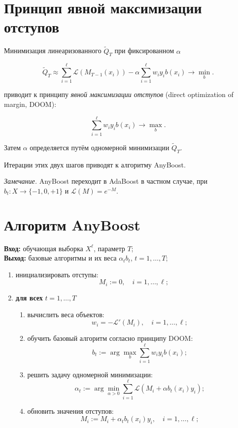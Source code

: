 \section*{Принцип явной максимизации отступов}

Минимизация линеаризованного $\tilde{Q}_T$ при фиксированном $\alpha$

\[
    \tilde{Q}_T \approx \sum_{i=1}^{\ell} \mathcal{L}(M_{T-1}(x_i)) - \alpha \sum_{i=1}^{\ell} w_i y_i b(x_i) \to \min_{b}.
\]

приводит к принципу \textit{явной максимизации отступов} (direct optimization of margin, DOOM):

\[
    \sum_{i=1}^{\ell} w_i y_i b(x_i) \to \max_{b}.
\]

Затем $\alpha$ определяется путём одномерной минимизации $\tilde{Q}_T$.

Итерации этих двух шагов приводят к алгоритму AnyBoost.

\textit{Замечание.} AnyBoost переходит в AdaBoost в частном случае, при $b_t : X \to \{-1, 0, +1\}$ и $\mathcal{L}(M) = e^{-M}$.


\section*{Алгоритм AnyBoost}

\textbf{Вход:} обучающая выборка $X^\ell$, параметр $T$;\\
\textbf{Выход:} базовые алгоритмы и их веса $\alpha_t b_t$, $t = 1, \ldots, T$;

\begin{enumerate}
    \item инициализировать отступы:
          \[
              M_i := 0, \quad i = 1, \ldots, \ell;
          \]
    \item \textbf{для всех} $t = 1, \ldots, T$
          \begin{enumerate}
              \item вычислить веса объектов:
                    \[
                        w_i = -\mathcal{L}'(M_i), \quad i = 1, \ldots, \ell;
                    \]
              \item обучить базовый алгоритм согласно принципу DOOM:
                    \[
                        b_t := \arg \max_{b} \sum_{i=1}^{\ell} w_i y_i b(x_i);
                    \]
              \item решить задачу одномерной минимизации:
                    \[
                        \alpha_t := \arg \min_{\alpha > 0} \sum_{i=1}^{\ell} \mathcal{L}(M_i + \alpha b_t(x_i) y_i);
                    \]
              \item обновить значения отступов:
                    \[
                        M_i := M_i + \alpha_t b_t(x_i) y_i, \quad i = 1, \ldots, \ell;
                    \]
          \end{enumerate}
\end{enumerate}

